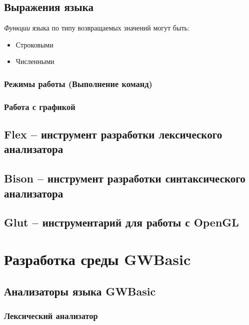 \documentclass[12pt]{article}
\begin{document}
			\subsection{Выражения языка}
			\hspace{\parindent} {\it Функции} языка по типу возвращаемых значений могут быть:
			\begin{itemize}
				\item Строковыми
				\item Численными
			\end{itemize}

			\subsubsection{Режимы работы (Выполнение команд)}

			\subsubsection{Работа с графикой}
		\subsection{Flex -- инструмент разработки лексического анализатора}
		\subsection{Bison -- инструмент разработки синтаксического анализатора}
		\subsection{Glut -- инструментарий для работы с OpenGL}
	\newpage
	\section{Разработка среды GWBasic}
		\subsection{Анализаторы языка GWBasic}
			\subsubsection{Лексический анализатор}
\end{document}
